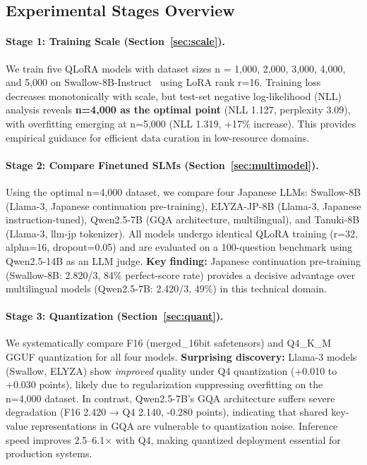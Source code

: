 \documentclass[twocolumn]{article}
\begin{document}
\subsection{Experimental Stages Overview}

\paragraph{Stage 1: Training Scale (Section~\ref{sec:scale}).}
We train five QLoRA models with dataset sizes n = 1,000, 2,000, 3,000, 4,000, and 5,000
on Swallow-8B-Instruct~\cite{okazaki2024swallow} using LoRA rank r=16.
Training loss decreases monotonically with scale, but test-set negative log-likelihood (NLL)
analysis reveals \textbf{n=4,000 as the optimal point} (NLL 1.127, perplexity 3.09),
with overfitting emerging at n=5,000 (NLL 1.319, +17\% increase).
This provides empirical guidance for efficient data curation in low-resource domains.

\paragraph{Stage 2: Compare Finetuned SLMs (Section~\ref{sec:multimodel}).}
Using the optimal n=4,000 dataset, we compare four Japanese LLMs: Swallow-8B (Llama-3,
Japanese continuation pre-training), ELYZA-JP-8B (Llama-3, Japanese instruction-tuned),
Qwen2.5-7B (GQA architecture, multilingual), and Tanuki-8B (Llama-3, llm-jp tokenizer).
All models undergo identical QLoRA training (r=32, alpha=16, dropout=0.05) and are evaluated
on a 100-question benchmark using Qwen2.5-14B as an LLM judge.
\textbf{Key finding:} Japanese continuation pre-training (Swallow-8B: 2.820/3, 84\%
perfect-score rate) provides a decisive advantage over multilingual models
(Qwen2.5-7B: 2.420/3, 49\%) in this technical domain.

\paragraph{Stage 3: Quantization (Section~\ref{sec:quant}).}
We systematically compare F16 (merged\_16bit safetensors) and Q4\_K\_M GGUF quantization
for all four models.
\textbf{Surprising discovery:} Llama-3 models (Swallow, ELYZA) show \emph{improved} quality
under Q4 quantization (+0.010 to +0.030 points), likely due to regularization suppressing
overfitting on the n=4,000 dataset.
In contrast, Qwen2.5-7B's GQA architecture suffers severe degradation
(F16 2.420 → Q4 2.140, -0.280 points), indicating that shared key-value representations
in GQA are vulnerable to quantization noise.
Inference speed improves 2.5--6.1$\times$ with Q4, making quantized deployment essential
for production systems.
\end{document}
